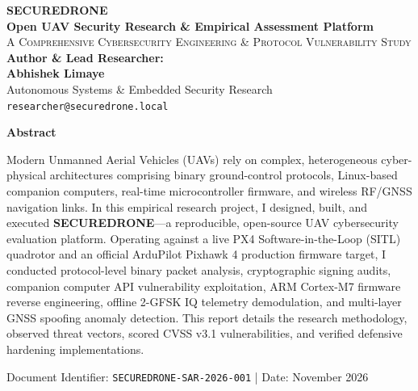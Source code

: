 \documentclass[11pt,a4paper]{article}
\begin{document}
\begin{titlepage}
    \centering
    \vspace*{1.5cm}
    
    {\Huge \textbf{\textcolor{primary}{SECUREDRONE}}}\\[0.4cm]
    {\Large \textbf{Open UAV Security Research \& Empirical Assessment Platform}}\\[0.8cm]
    {\normalsize \textsc{A Comprehensive Cybersecurity Engineering \& Protocol Vulnerability Study}}\\[2cm]

    \textbf{Author \& Lead Researcher:}\\
    \Large \textbf{Abhishek Limaye}\\
    \normalsize Autonomous Systems \& Embedded Security Research\\[0.3cm]
    \texttt{researcher@securedrone.local}\\[2.5cm]

    \begin{minipage}{0.85\textwidth}
        \begin{center}
        \textbf{Abstract}
        \end{center}
        \small
        Modern Unmanned Aerial Vehicles (UAVs) rely on complex, heterogeneous cyber-physical architectures comprising binary ground-control protocols, Linux-based companion computers, real-time microcontroller firmware, and wireless RF/GNSS navigation links. In this empirical research project, I designed, built, and executed \textbf{SECUREDRONE}---a reproducible, open-source UAV cybersecurity evaluation platform. Operating against a live PX4 Software-in-the-Loop (SITL) quadrotor and an official ArduPilot Pixhawk 4 production firmware target, I conducted protocol-level binary packet analysis, cryptographic signing audits, companion computer API vulnerability exploitation, ARM Cortex-M7 firmware reverse engineering, offline 2-GFSK IQ telemetry demodulation, and multi-layer GNSS spoofing anomaly detection. This report details the research methodology, observed threat vectors, scored CVSS v3.1 vulnerabilities, and verified defensive hardening implementations.
    \end{minipage}

    \vfill
    {\footnotesize Document Identifier: \texttt{SECUREDRONE-SAR-2026-001} \quad | \quad Date: November 2026}
\end{titlepage}

\tableofcontents
\newpage
\end{document}
